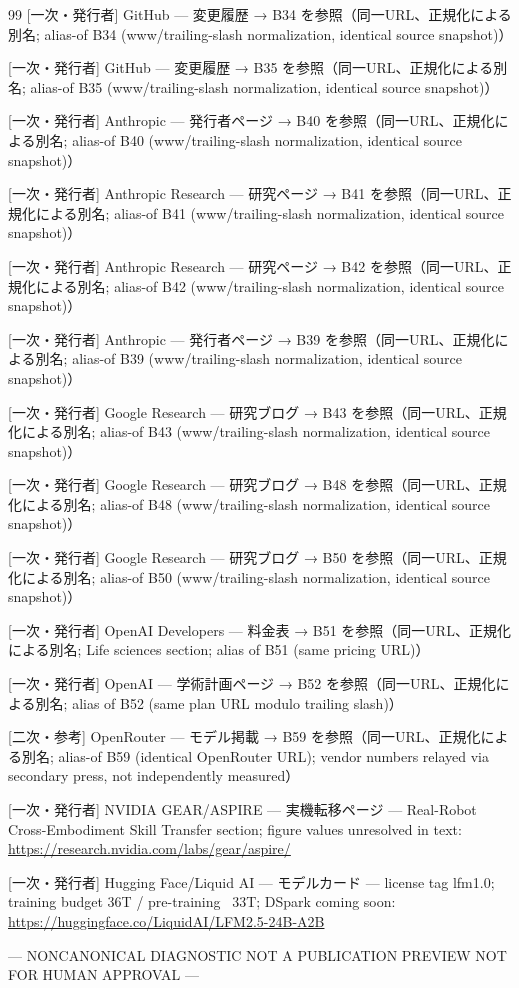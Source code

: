 \documentclass[lualatex,a4paper,10pt]{jlreq}
\begin{document}
\begin{thebibliography}{99}
 [一次・発行者] GitHub — 変更履歴 → B34 を参照（同一URL、正規化による別名; alias-of B34 (www/trailing-slash normalization, identical source snapshot)）

 [一次・発行者] GitHub — 変更履歴 → B35 を参照（同一URL、正規化による別名; alias-of B35 (www/trailing-slash normalization, identical source snapshot)）

 [一次・発行者] Anthropic — 発行者ページ → B40 を参照（同一URL、正規化による別名; alias-of B40 (www/trailing-slash normalization, identical source snapshot)）

 [一次・発行者] Anthropic Research — 研究ページ → B41 を参照（同一URL、正規化による別名; alias-of B41 (www/trailing-slash normalization, identical source snapshot)）

 [一次・発行者] Anthropic Research — 研究ページ → B42 を参照（同一URL、正規化による別名; alias-of B42 (www/trailing-slash normalization, identical source snapshot)）

 [一次・発行者] Anthropic — 発行者ページ → B39 を参照（同一URL、正規化による別名; alias-of B39 (www/trailing-slash normalization, identical source snapshot)）

 [一次・発行者] Google Research — 研究ブログ → B43 を参照（同一URL、正規化による別名; alias-of B43 (www/trailing-slash normalization, identical source snapshot)）

 [一次・発行者] Google Research — 研究ブログ → B48 を参照（同一URL、正規化による別名; alias-of B48 (www/trailing-slash normalization, identical source snapshot)）

 [一次・発行者] Google Research — 研究ブログ → B50 を参照（同一URL、正規化による別名; alias-of B50 (www/trailing-slash normalization, identical source snapshot)）

 [一次・発行者] OpenAI Developers — 料金表 → B51 を参照（同一URL、正規化による別名; Life sciences section; alias of B51 (same pricing URL)）

 [一次・発行者] OpenAI — 学術計画ページ → B52 を参照（同一URL、正規化による別名; alias of B52 (same plan URL modulo trailing slash)）

 [二次・参考] OpenRouter — モデル掲載 → B59 を参照（同一URL、正規化による別名; alias-of B59 (identical OpenRouter URL); vendor numbers relayed via secondary press, not independently measured）

 [一次・発行者] NVIDIA GEAR/ASPIRE — 実機転移ページ — Real-Robot Cross-Embodiment Skill Transfer section; figure values unresolved in text: \url{https://research.nvidia.com/labs/gear/aspire/}

 [一次・発行者] Hugging Face/Liquid AI — モデルカード — license tag lfm1.0; training budget 36T / pre-training ~33T; DSpark coming soon: \url{https://huggingface.co/LiquidAI/LFM2.5-24B-A2B}

\end{thebibliography}

\begin{center}\color{SurveyMuted}--- NONCANONICAL DIAGNOSTIC \quad NOT A PUBLICATION PREVIEW \quad NOT FOR HUMAN APPROVAL ---\end{center}
\end{document}
